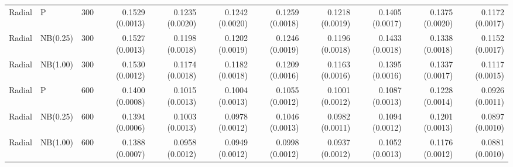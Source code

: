 \begin{table}[p]
{\begin{tabular}{lllrrrrrrrr}
\hline

Radial & P & 300
& 0.1529 (0.0013)
& 0.1235 (0.0020)
& 0.1242 (0.0020)
& 0.1259 (0.0018)
& 0.1218 (0.0019)
& 0.1405 (0.0017)
& 0.1375 (0.0020)
& 0.1172 (0.0017) \\

Radial & NB(0.25) & 300
& 0.1527 (0.0013)
& 0.1198 (0.0018)
& 0.1202 (0.0019)
& 0.1246 (0.0019)
& 0.1196 (0.0018)
& 0.1433 (0.0018)
& 0.1338 (0.0018)
& 0.1152 (0.0017) \\

Radial & NB(1.00) & 300
& 0.1530 (0.0012)
& 0.1174 (0.0018)
& 0.1182 (0.0018)
& 0.1209 (0.0016)
& 0.1163 (0.0016)
& 0.1395 (0.0016)
& 0.1337 (0.0017)
& 0.1117 (0.0015) \\

Radial & P & 600
& 0.1400 (0.0008)
& 0.1015 (0.0013)
& 0.1004 (0.0013)
& 0.1055 (0.0012)
& 0.1001 (0.0012)
& 0.1087 (0.0013)
& 0.1228 (0.0014)
& 0.0926 (0.0011) \\

Radial & NB(0.25) & 600
& 0.1394 (0.0006)
& 0.1003 (0.0013)
& 0.0978 (0.0012)
& 0.1046 (0.0013)
& 0.0982 (0.0011)
& 0.1094 (0.0012)
& 0.1201 (0.0013)
& 0.0897 (0.0010) \\

Radial & NB(1.00) & 600
& 0.1388 (0.0007)
& 0.0958 (0.0012)
& 0.0949 (0.0012)
& 0.0998 (0.0012)
& 0.0937 (0.0012)
& 0.1052 (0.0013)
& 0.1176 (0.0012)
& 0.0881 (0.0010) \\

\hline
\end{tabular}%
}
\end{table}

